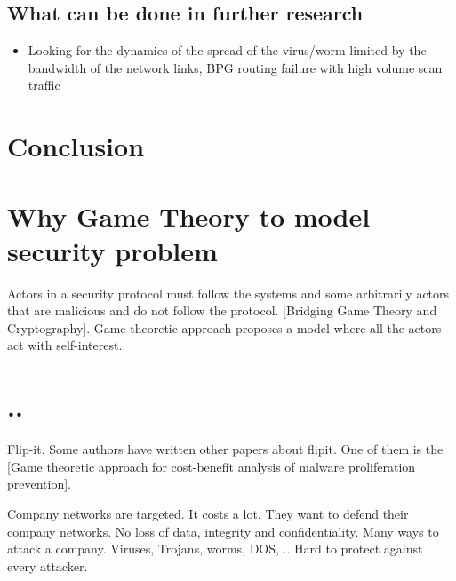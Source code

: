 \subsection{What can be done in further research}
\begin{itemize}
\item Looking for the dynamics of the spread of the virus/worm limited by the bandwidth of the network links, BPG routing failure with high volume scan traffic
\end{itemize}
\section{Conclusion}

\section{Why Game Theory to model security problem}
Actors in a security protocol must follow the systems and some arbitrarily actors that are malicious and do not follow the protocol. [Bridging Game Theory and Cryptography]. Game theoretic approach proposes a model where all the actors act with self-interest. 

\section{..}

Flip-it. Some authors have written other papers about flipit. One of them is the [Game theoretic approach for cost-benefit analysis of malware proliferation prevention]. 


Company networks are targeted. It costs a lot. They want to defend their company networks. No loss of data, integrity and confidentiality.  Many ways to attack a company. Viruses, Trojans, worms, DOS, .. Hard to protect against every attacker.



